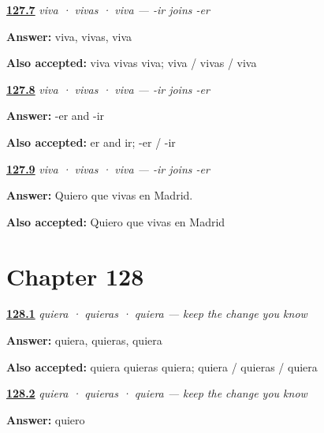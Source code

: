 \noindent\begin{minipage}[t]{\linewidth}
\raggedright
\hyperlink{review-ES-C18-vivir-subjuntivo-forms}{\textbf{127.7}} \emph{viva · vivas · viva — -ir joins -er}\par
\small \textbf{Answer:} viva, vivas, viva\par
\footnotesize \textbf{Also accepted:} viva vivas viva; viva / vivas / viva
\end{minipage}\par\medskip

\noindent\begin{minipage}[t]{\linewidth}
\raggedright
\hyperlink{review-ES-C18-vivir-subjuntivo-er-ir-match}{\textbf{127.8}} \emph{viva · vivas · viva — -ir joins -er}\par
\small \textbf{Answer:} -er and -ir\par
\footnotesize \textbf{Also accepted:} er and ir; -er / -ir
\end{minipage}\par\medskip

\noindent\begin{minipage}[t]{\linewidth}
\raggedright
\hyperlink{review-ES-C18-vivir-subjuntivo-wanted}{\textbf{127.9}} \emph{viva · vivas · viva — -ir joins -er}\par
\small \textbf{Answer:} Quiero que vivas en Madrid.\par
\footnotesize \textbf{Also accepted:} Quiero que vivas en Madrid
\end{minipage}\par\medskip

\section*{Chapter 128}

\noindent\begin{minipage}[t]{\linewidth}
\raggedright
\hyperlink{review-ES-C18-querer-subjuntivo-forms}{\textbf{128.1}} \emph{quiera · quieras · quiera — keep the change you know}\par
\small \textbf{Answer:} quiera, quieras, quiera\par
\footnotesize \textbf{Also accepted:} quiera quieras quiera; quiera / quieras / quiera
\end{minipage}\par\medskip

\noindent\begin{minipage}[t]{\linewidth}
\raggedright
\hyperlink{review-ES-C18-querer-subjuntivo-stem}{\textbf{128.2}} \emph{quiera · quieras · quiera — keep the change you know}\par
\small \textbf{Answer:} quiero\par
\end{minipage}\par\medskip

